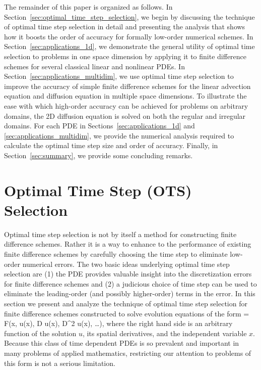\documentclass[oneeqnum,onefignum,onetabnum,onethmnum]{siamltex}
\begin{document}
The remainder of this paper is organized as follows.  
In Section~\ref{sec:optimal_time_step_selection}, we begin by 
discussing the technique of optimal time step selection in detail and 
presenting the analysis that shows how it boosts the order of accuracy 
for formally low-order numerical schemes.  In 
Section~\ref{sec:applications_1d}, we demonstrate the general utility of 
optimal time selection to problems in one space dimension by applying it to 
finite difference schemes for several classical linear and nonlinear PDEs. 
In Section~\ref{sec:applications_multidim}, we use optimal time step selection 
to improve the accuracy of simple finite difference schemes for the linear 
advection equation and diffusion equation in multiple space dimensions.  
To illustrate the ease with which high-order accuracy can be achieved for
problems on arbitrary domains, the 2D diffusion equation is solved on both 
the regular and irregular domains.  
For each PDE in Sections~\ref{sec:applications_1d} and 
\ref{sec:applications_multidim}, we provide the numerical analysis required 
to calculate the optimal time step size and order of accuracy.  
Finally, in Section~\ref{sec:summary}, we provide some concluding remarks. 


\section{\label{sec:optimal_time_step_selection} 
         Optimal Time Step (OTS) Selection}
Optimal time step selection is not by itself a method for constructing 
finite difference schemes.  Rather it is a way to enhance to the performance
of existing finite difference schemes by carefully choosing the time step to 
eliminate low-order numerical errors.  The two basic ideas underlying 
optimal time step selection are (1) the PDE provides valuable insight into the 
discretization errors for finite difference schemes and (2) a judicious choice 
of time step can be used to eliminate the leading-order (and possibly 
higher-order) terms in the error.  In this section we present and analyze the 
technique of optimal time step selection for finite difference schemes 
constructed to solve evolution equations of the form 
\beq
   = 
    F\left(x, u(x), D u(x), D^2 u(x), \ldots \right), 
\eeq
where the right hand side is an arbitrary function of the solution $u$, its 
spatial derivatives, and the independent variable $x$.
Because this class of time dependent PDEs is so prevalent and important in 
many problems of applied mathematics, restricting our attention to problems 
of this form is not a serious limitation.  
\end{document}
